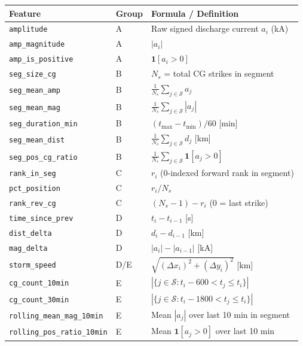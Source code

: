 \documentclass[12pt,a4paper]{article}
\begin{document}
\begin{longtable}{L{3.8cm} C{1.4cm} L{8.5cm}}
\toprule
\textbf{Feature} & \textbf{Group} & \textbf{Formula / Definition} \\
\midrule
\texttt{amplitude}               & A & Raw signed discharge current $a_i$ (kA) \\
\texttt{amp\_magnitude}          & A & $|a_i|$ \\
\texttt{amp\_is\_positive}       & A & $\mathbf{1}[a_i > 0]$ \\
\midrule
\texttt{seg\_size\_cg}           & B & $N_s$ = total CG strikes in segment \\
\texttt{seg\_mean\_amp}          & B & $\frac{1}{N_s}\sum_{j\in\mathcal{S}} a_j$ \\
\texttt{seg\_mean\_mag}          & B & $\frac{1}{N_s}\sum_{j\in\mathcal{S}} |a_j|$ \\
\texttt{seg\_duration\_min}      & B & $(t_{\max} - t_{\min})/60$ [min] \\
\texttt{seg\_mean\_dist}         & B & $\frac{1}{N_s}\sum_{j\in\mathcal{S}} d_j$ [km] \\
\texttt{seg\_pos\_cg\_ratio}     & B & $\frac{1}{N_s}\sum_{j\in\mathcal{S}} \mathbf{1}[a_j>0]$ \\
\midrule
\texttt{rank\_in\_seg}           & C & $r_i$ (0-indexed forward rank in segment) \\
\texttt{pct\_position}           & C & $r_i / N_s$ \\
\texttt{rank\_rev\_cg}           & C & $(N_s-1) - r_i$ \quad \textcolor{warningcolor}{(0 = last strike)} \\
\midrule
\texttt{time\_since\_prev}       & D & $t_i - t_{i-1}$ [s] \\
\texttt{dist\_delta}             & D & $d_i - d_{i-1}$ [km] \\
\texttt{mag\_delta}              & D & $|a_i| - |a_{i-1}|$ [kA] \\
\texttt{storm\_speed}            & D/E & $\sqrt{(\Delta x_i)^2 + (\Delta y_i)^2}$ [km] \\
\midrule
\texttt{cg\_count\_10min}        & E & $|\{j\in\mathcal{S}: t_i{-}600 < t_j \leq t_i\}|$ \\
\texttt{cg\_count\_30min}        & E & $|\{j\in\mathcal{S}: t_i{-}1800 < t_j \leq t_i\}|$ \\
\texttt{rolling\_mean\_mag\_10min}& E & Mean $|a_j|$ over last 10 min in segment \\
\texttt{rolling\_pos\_ratio\_10min}& E & Mean $\mathbf{1}[a_j>0]$ over last 10 min \\

\end{longtable}
\end{document}
